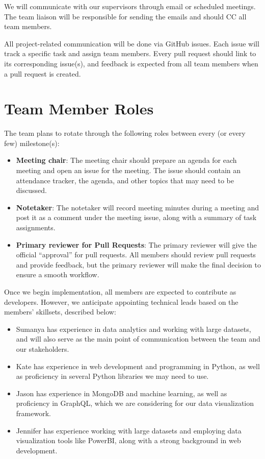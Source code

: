\documentclass{article}
\begin{document}
We will communicate with our supervisors through email or scheduled meetings.
The team liaison will be responsible for sending the emails and should CC all team
members.

All project-related communication will be done via GitHub issues. Each issue will track
a specific task and assign team members. Every pull request should link to its 
corresponding issue(s), and feedback is expected from all team members when a pull request 
is created.

\section{Team Member Roles}

The team plans to rotate through the following roles between every (or
every few) milestone(s):

\begin{itemize}
  \item \textbf{Meeting chair}: The meeting chair should prepare an agenda for each
  meeting and open an issue for the meeting. The issue should contain an attendance
  tracker, the agenda, and other topics that may need to be discussed.
  \item \textbf{Notetaker}: The notetaker will record meeting minutes during a 
  meeting and post it as a comment under the meeting issue, along with a summary of 
  task assignments.
  \item \textbf{Primary reviewer for Pull Requests}: The primary reviewer will give
  the official ``approval'' for pull requests. All members should review pull requests
  and provide feedback, but the primary reviewer will make the final decision to
  ensure a smooth workflow.
\end{itemize}

Once we begin implementation, all members are expected to contribute as developers.
However, we anticipate appointing technical leads based on the members' skillsets, 
described below:

\begin{itemize}
  \item Sumanya has experience in data analytics and working with large datasets,
  and will also serve as the main point of communication between the team and our
  stakeholders.
  \item Kate has experience in web development and programming in Python, as well
  as proficiency in several Python libraries we may need to use.
  \item Jason has experience in MongoDB and machine learning, as well as proficiency
  in GraphQL, which we are considering for our data visualization framework.
  \item Jennifer has experience working with large datasets and employing data
  visualization tools like PowerBI, along with a strong background in web development.
\end{itemize}
\end{document}
